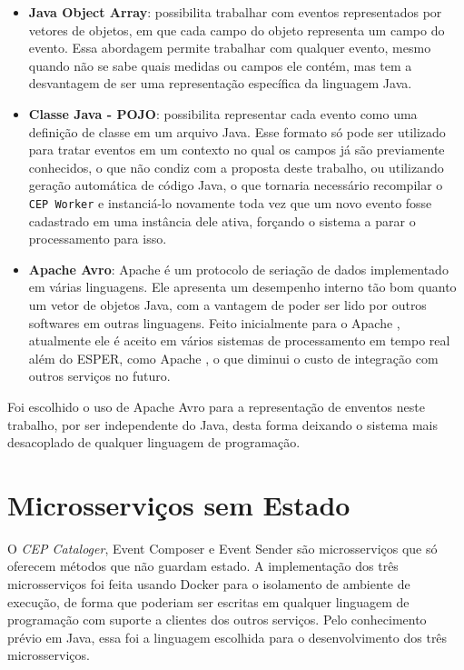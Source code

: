 \begin{itemize}
\item \textbf{Java Object Array}: possibilita trabalhar com eventos representados por vetores de objetos, em que cada campo do objeto representa um campo do evento. Essa abordagem permite trabalhar com qualquer evento, mesmo quando não se sabe quais medidas ou campos ele contém, mas tem a desvantagem de ser uma representação específica da linguagem Java.
\item \textbf{Classe Java - POJO}: possibilita representar cada evento como uma definição de classe em um arquivo Java. Esse formato só pode ser utilizado para tratar eventos em um contexto no qual os campos já são previamente conhecidos, o que não condiz com a proposta deste trabalho, ou utilizando geração automática de código Java, o que tornaria necessário recompilar o \texttt{CEP Worker} e instanciá-lo novamente toda vez que um novo evento fosse cadastrado em uma instância dele ativa, forçando o sistema a parar o processamento para isso.
\item \textbf{Apache Avro}: Apache \cite{Avro} é um protocolo de seriação de dados implementado em várias linguagens. Ele apresenta um desempenho interno tão bom quanto um vetor de objetos Java, com a vantagem de poder ser lido por outros softwares em outras linguagens. Feito inicialmente para o Apache \cite{hadoop}, atualmente ele é aceito em vários sistemas de processamento em tempo real além do ESPER, como Apache \cite{spark}, o que diminui o custo de integração com outros serviços no futuro.
\end{itemize}

Foi escolhido o uso de Apache Avro para a representação de enventos neste trabalho, por ser independente do Java, desta forma deixando o sistema mais desacoplado de qualquer linguagem de programação. 


\section{Microsserviços sem Estado}
O \textit{CEP Cataloger}, Event Composer e Event Sender são microsserviços que só oferecem métodos que não guardam estado. A implementação dos três microsserviços foi feita usando Docker para o isolamento de ambiente de execução, de forma que poderiam ser escritas em qualquer linguagem de programação com suporte a clientes dos outros serviços. Pelo conhecimento prévio em Java, essa foi a linguagem escolhida para o desenvolvimento dos três microsserviços.



